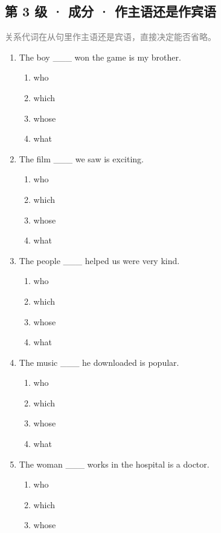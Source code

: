 \documentclass[11pt,a4paper]{ctexart}
\begin{document}
\subsection*{第 3 级 · 成分 · 作主语还是作宾语}
\noindent\textcolor{gray}{关系代词在从句里作主语还是宾语，直接决定能否省略。}\par\smallskip
\begin{enumerate}[leftmargin=*,itemsep=4pt]
\item The boy \_\_\_ won the game is my brother.
\begin{enumerate}[label=\Alph*.,leftmargin=2em,itemsep=1pt,topsep=2pt]
\item who
\item which
\item whose
\item what
\end{enumerate}
\item The film \_\_\_ we saw is exciting.
\begin{enumerate}[label=\Alph*.,leftmargin=2em,itemsep=1pt,topsep=2pt]
\item who
\item which
\item whose
\item what
\end{enumerate}
\item The people \_\_\_ helped us were very kind.
\begin{enumerate}[label=\Alph*.,leftmargin=2em,itemsep=1pt,topsep=2pt]
\item who
\item which
\item whose
\item what
\end{enumerate}
\item The music \_\_\_ he downloaded is popular.
\begin{enumerate}[label=\Alph*.,leftmargin=2em,itemsep=1pt,topsep=2pt]
\item who
\item which
\item whose
\item what
\end{enumerate}
\item The woman \_\_\_ works in the hospital is a doctor.
\begin{enumerate}[label=\Alph*.,leftmargin=2em,itemsep=1pt,topsep=2pt]
\item who
\item which
\item whose

\end{enumerate}
\end{enumerate}
\end{document}
